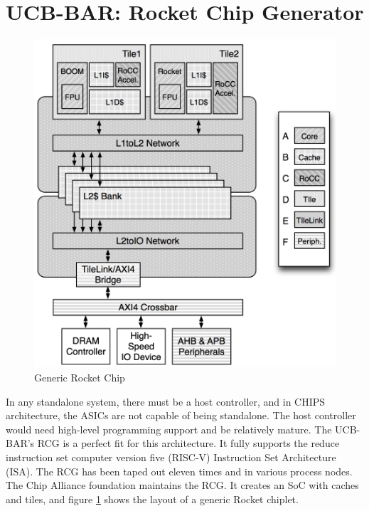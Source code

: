 \documentclass[../main.tex]{subfiles}
\begin{document}
\section{UCB-BAR: Rocket Chip Generator}
\label{sec:RCG}
\begin{figure}
    \centering
    \includegraphics[scale=.35]{pngs/RocketChipGeneratorLayout.png}
    \caption{Generic Rocket Chip\cite{Asanović:EECS-2016-17}}
    \label{fig:RocketCipGen}
\end{figure}

In any standalone system, there must be a host controller, and in CHIPS architecture, the ASICs are not capable of being standalone. The host controller would need high-level programming support and be relatively mature. The UCB-BAR's RCG is a perfect fit for this architecture. It fully supports the reduce instruction set computer version five (RISC-V) Instruction Set Architecture (ISA). The RCG has been taped out eleven times and in various process nodes. The Chip Alliance foundation maintains the RCG. It creates an SoC with caches and tiles, and figure \ref{fig:RocketCipGen} shows the layout of a generic Rocket chiplet. 
\end{document}
